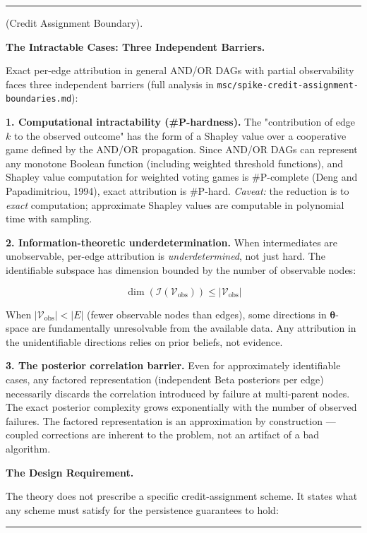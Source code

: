 \documentclass[11pt,oneside]{article}
\newcounter{claim}[section]
\renewcommand{\theclaim}{\thesection.\arabic{claim}}
\newenvironment{segment}[2]{%
  \refstepcounter{claim}%
  \bigskip\noindent\hrule\smallskip
  \noindent{\bfseries #1~\theclaim}\enskip(#2).\par\smallskip
  \noindent\ignorespaces
}{%
  \par\smallskip\noindent\hrule\bigskip
}
\newenvironment{discussion}[1][]{\begin{segment}{Discussion}{#1}}{\end{segment}}
\begin{document}
\begin{discussion}[Credit Assignment Boundary]
\medskip\noindent\textbf{The Intractable Cases: Three Independent Barriers.}



Exact per-edge attribution in general AND/OR DAGs with partial observability faces three independent barriers (full analysis in \texttt{msc/spike-credit-assignment-boundaries.md}):

\textbf{1. Computational intractability (\#P-hardness).} The "contribution of edge $k$ to the observed outcome" has the form of a Shapley value over a cooperative game defined by the AND/OR propagation. Since AND/OR DAGs can represent any monotone Boolean function (including weighted threshold functions), and Shapley value computation for weighted voting games is \#P-complete (Deng and Papadimitriou, 1994), exact attribution is \#P-hard. \textit{Caveat:} the reduction is to \textit{exact} computation; approximate Shapley values are computable in polynomial time with sampling.

\textbf{2. Information-theoretic underdetermination.} When intermediates are unobservable, per-edge attribution is \textit{underdetermined}, not just hard. The identifiable subspace has dimension bounded by the number of observable nodes:

$$\dim(\mathcal{I}(\mathcal{V}_{\text{obs}})) \leq \lvert\mathcal{V}_{\text{obs}}\rvert$$

When $\lvert\mathcal{V}_{\text{obs}}\rvert < \lvert E\rvert$ (fewer observable nodes than edges), some directions in $\boldsymbol\theta$-space are fundamentally unresolvable from the available data. Any attribution in the unidentifiable directions relies on prior beliefs, not evidence.

\textbf{3. The posterior correlation barrier.} Even for approximately identifiable cases, any factored representation (independent Beta posteriors per edge) necessarily discards the correlation introduced by failure at multi-parent nodes. The exact posterior complexity grows exponentially with the number of observed failures. The factored representation is an approximation by construction — coupled corrections are inherent to the problem, not an artifact of a bad algorithm.


\medskip\noindent\textbf{The Design Requirement.}



The theory does not prescribe a specific credit-assignment scheme. It states what any scheme must satisfy for the persistence guarantees to hold:


\end{discussion}
\end{document}
